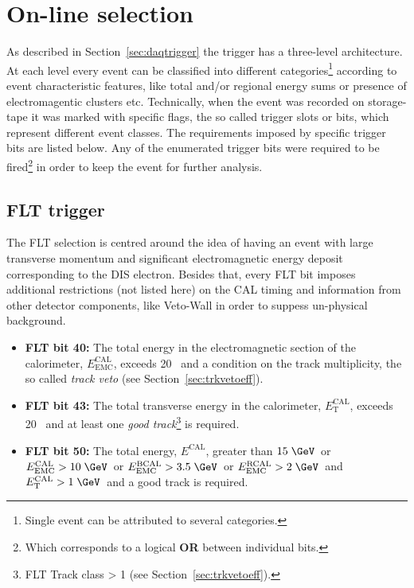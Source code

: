 \section{On-line selection}
\label{sec:onlineselect}
As described in Section~\ref{sec:daqtrigger} the \zeus trigger has a three-level architecture. At each level every event can be classified into different categories\footnote{Single event can be attributed to several categories.} according to event characteristic features, like total and/or regional energy sums or presence of electromagentic clusters etc. Technically, when the event was recorded on storage-tape it was marked with specific flags, the so called trigger slots or bits, which represent different event classes. The requirements imposed by specific trigger bits are listed below. Any of the enumerated trigger bits were required to be fired\footnote{Which corresponds to a logical \textbf{OR} between individual bits.} in order to keep the event for further analysis. 

\subsection{FLT trigger}
\label{subsec:fltcuts}
The FLT selection is centred around the idea of having an event with large transverse momentum and significant electromagnetic energy deposit corresponding to the DIS electron. Besides that, every FLT bit imposes additional restrictions (not listed here) on the CAL timing and information from other detector components, like Veto-Wall in order to suppess un-physical background.
\begin{itemize}
	\item \textbf{FLT bit 40:} The total energy in the electromagnetic section of the calorimeter, $E_\text{EMC}^\text{CAL}$, exceeds 20 \GeV\, and a condition on the track multiplicity, the so called \textit{track veto} (see Section~\ref{sec:trkvetoeff}).
	\item \textbf{FLT bit 43:} The total transverse energy in the calorimeter, $E_\text{T}^\text{CAL}$, exceeds 20 \GeV\, and at least one \textit{good track}\footnote{FLT Track class > 1 (see Section~\ref{sec:trkvetoeff}).} is required.
	\item \textbf{FLT bit 50:} The total energy, $E^\text{CAL}$, greater than $15\; \GeV$\, or $E_\text{EMC}^\text{CAL} > 10\; \GeV\,$ or $E_\text{EMC}^\text{BCAL} > 3.5\; \GeV$\, or $E_\text{EMC}^\text{RCAL} > 2\; \GeV$\, and $E_\text{T}^\text{CAL} > 1\; \GeV$\, and a good track is required.
\end{itemize}

